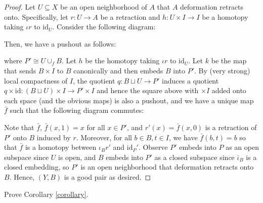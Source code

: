 \documentclass[12pt,reqno]{amsart}
\numberwithin{theorem}{section}
\theoremstyle{definition}
\theoremstyle{remark}
\numberwithin{equation}{section}
\theoremstyle{definition}
\newcommand{\id}{\mathrm{id}}
\begin{document}
\begin{proof}
    Let $U\subseteq X$ be an open neighborhood of $A$ that $A$ deformation retracts onto. Specifically, let $r:U\rightarrow A$ be a retraction and $h :U\times I\rightarrow I$ be a homotopy taking $\iota r$ to $\id_U$. Consider the following diagram:
        \begin{center}
    \end{center}
    Then, we have a pushout as follows:
    \begin{center}
    \end{center}
    where $P' \cong U \cup_f B$. Let $h$ be the homotopy taking $\iota r$ to $\id_U$. Let $k$ be the map that sends $B\times I$ to $B$ canonically and then embeds $B$ into $P'$. By (very strong) local compactness of $I$, the quotient $q: B\sqcup U \rightarrow P'$ induces a quotient $q\times \id : (B\sqcup U) \times I \rightarrow P'\times I$ and hence the square above with $\times I$ added onto each space (and the obvious maps) is also a pushout, and we have a unique map $\bar f$ such that the following diagram commutes:
    \begin{center}
    \end{center}
Note that $\bar f$, $\bar f (x,1) = x$ for all $x \in P'$, and $r'(x)=\bar f(x,0)$ is a retraction of $P'$ onto $B$ induced by $r$. Moreover, for all $b \in B, t \in I$, we have $\bar f(b,t) = b$ so that $\bar f$ is a homotopy between $\iota_B r'$ and $\id _P'$. Observe $P'$ embeds into $P$ as an open subspace since $U$ is open, and $B$ embeds into $P'$ as a closed subspace since $\bar \iota_B$ is a closed embedding, so $P'$ is an open neighborhood that deformation retracts onto $B$. Hence, $(Y,B)$ is a good pair as desired.
\end{proof}
\begin{exercise}
    Prove Corollary \ref{corollary}.
\end{exercise}
\printbibliography
\end{document}
